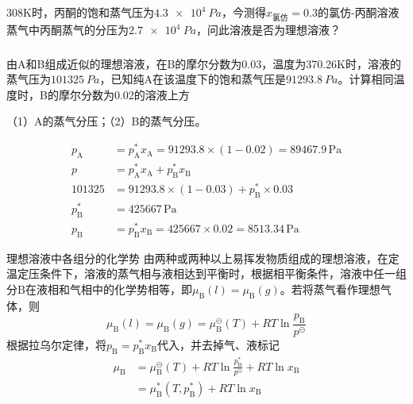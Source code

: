 \begin{frame}[t]
    \begin{example}
        308K时，丙酮的饱和蒸气压为$\SI{4.3e4}{Pa}$，今测得$x_{\text{氯仿}}=0.3$的氯仿-丙酮溶液蒸气中丙酮蒸气的分压为$\SI{2.7e4}{Pa}$，问此溶液是否为理想溶液？
    \end{example}
\end{frame}


\begin{frame}[t]
    \frametitle{}
    \begin{example}
        由A和B组成近似的理想溶液，在B的摩尔分数为0.03，温度为370.26K时，溶液的蒸气压为$\SI{101325}{Pa}$，已知纯A在该温度下的饱和蒸气压是$\SI{91293.8}{Pa}$。计算相同温度时，B的摩尔分数为0.02的溶液上方
        
        （1）A的蒸气分压；（2）B的蒸气分压。
    \end{example}
    \pause
    \[
        \begin{aligned}
            p_\mathrm{A}&=p_\mathrm{A}^* x_\mathrm{A} = 91293.8\times (1-0.02) = 89467.9 \,\mathrm{Pa} \\
            p &= p_\mathrm{A}^* x_\mathrm{A} + p_\mathrm{B}^* x_\mathrm{B} \\
            101325 &= 91293.8\times (1-0.03) + p_\mathrm{B}^* \times 0.03 \\
            p_\mathrm{B}^* &= 425667 \,\mathrm{Pa} \\
            p_\mathrm{B}&=p_\mathrm{B}^* x_\mathrm{B} = 425667 \times 0.02 = 8513.34 \,\mathrm{Pa}
        \end{aligned}
    \]
\end{frame}



\begin{frame}{理想溶液中各组分的化学势}
    由两种或两种以上易挥发物质组成的理想溶液，在定温定压条件下，溶液的蒸气相与液相达到平衡时，根据相平衡条件，溶液中任一组分B在液相和气相中的化学势相等，即$\mu_\mathrm{B}(l)=\mu_\mathrm{B}(g)$。若将蒸气看作理想气体，则
    $$\mu_\mathrm{B}(l)=\mu_\mathrm{B}(g)=\mu_{\mathrm{B}}^\ominus(T) +R T \ln \frac{p_{\mathrm{B}}}{p^{\ominus}}$$
    根据拉乌尔定律，将$p_\mathrm{B}=p_\mathrm{B}^*x_\mathrm{B}$代入，并去掉气、液标记 
    \[
        \begin{aligned}
            \mu_\mathrm{B}&=\mu_{\mathrm{B}}^\ominus(T) +R T \ln \frac{p_{\mathrm{B}}^*}{p^{\ominus}}+RT\ln x_\mathrm{B} \\
            &= \mu_{\mathrm{B}}^*(T,p_\mathrm{B}^*) +R T \ln x_\mathrm{B}
        \end{aligned}
    \]
\end{frame}


